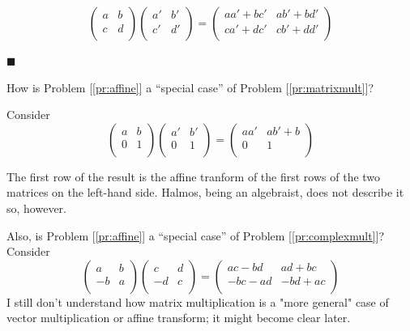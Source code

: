 \documentclass[english,notitlepage,smartquotes]{hgbreport}
\theoremstyle{definition}
\theoremstyle{definition}
\theoremstyle{remark}
\theoremstyle{definition}
\theoremstyle{plain}
\renewcommand\qedsymbol{$\blacksquare$}
\theoremstyle{definition}
\begin{document}
\[
  \begin{pmatrix}
    a & b\\
    c & d\\
  \end{pmatrix}
  \begin{pmatrix}
    a' & b'\\
    c' & d'\\
  \end{pmatrix}
  =
  \begin{pmatrix}
    aa'+bc' & ab'+bd'\\
    ca'+dc' & cb'+dd'\\
  \end{pmatrix}
\]

\qedsymbol

How is Problem [\ref{pr:affine}] a ``special case'' of Problem [\ref{pr:matrixmult}]?

Consider
\[
  \begin{pmatrix}
    a & b\\
    0 & 1\\
  \end{pmatrix}
  \begin{pmatrix}
    a' & b'\\
    0 & 1\\
  \end{pmatrix}
  =
  \begin{pmatrix}
    aa' & ab'+b\\
    0 & 1\\
  \end{pmatrix}
\]

The first row of the result is the affine tranform of the first rows of the two matrices on the left-hand side. Halmos, being an algebraist, does not describe it so, however. 

Also, is Problem [\ref{pr:affine}] a ``special case'' of Problem [\ref{pr:complexmult}]?
Consider
\[
  \begin{pmatrix}
    a & b\\
    -b & a\\
  \end{pmatrix}
  \begin{pmatrix}
    c & d\\
    -d & c\\
  \end{pmatrix}
  =
  \begin{pmatrix}
    ac-bd & ad+bc\\
    -bc-ad &-bd+ac\\
  \end{pmatrix}
\]
I still don't understand how matrix multiplication is a "more general" case of vector multiplication or affine transform; it might become clear later.
\end{document}

